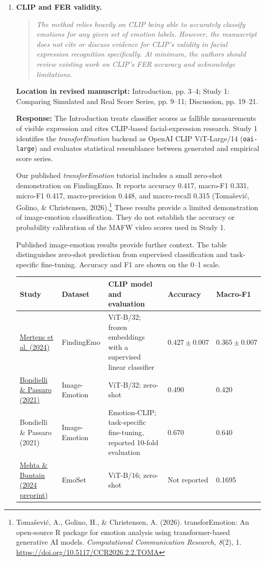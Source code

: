 \documentclass[11pt]{article}
\newenvironment{reviewquote}{\begin{quote}\small\itshape}{\end{quote}}
\newcommand{\point}[1]{\textbf{#1.}}
\newcommand{\location}[1]{\textbf{Location in revised manuscript:} #1\par}
\newcommand{\response}{\textbf{Response:} }
\begin{document}
\begin{enumerate}[resume]
  \item \point{CLIP and FER validity}
  \begin{reviewquote}
  The method relies heavily on CLIP being able to accurately classify emotions for any given set of emotion labels. However, the manuscript does not cite or discuss evidence for CLIP's validity in facial expression recognition specifically. At minimum, the authors should review existing work on CLIP's FER accuracy and acknowledge limitations.
  \end{reviewquote}
  \location{Introduction, pp. 3--4; Study 1: Comparing Simulated and Real Score Series, pp. 9--11; Discussion, pp. 19--21.}
  \response The Introduction treats classifier scores as fallible measurements of visible expression and cites CLIP-based facial-expression research. Study 1 identifies the \textit{transforEmotion} backend as OpenAI CLIP ViT-Large/14 (\texttt{oai-large}) and evaluates statistical resemblance between generated and empirical score series.

  Our published \textit{transforEmotion} tutorial includes a small zero-shot demonstration on FindingEmo. It reports accuracy 0.417, macro-F1 0.331, micro-F1 0.417, macro-precision 0.448, and macro-recall 0.315 (Tomašević, Golino, \& Christensen, 2026).\footnote{Tomašević, A., Golino, H., \& Christensen, A. (2026). transforEmotion: An open-source R package for emotion analysis using transformer-based generative AI models. \textit{Computational Communication Research, 8}(2), 1. \url{https://doi.org/10.5117/CCR2026.2.2.TOMA}} These results provide a limited demonstration of image-emotion classification. They do not establish the accuracy or probability calibration of the MAFW video scores used in Study 1.

  Published image-emotion results provide further context. The table distinguishes zero-shot prediction from supervised classification and task-specific fine-tuning. Accuracy and F1 are shown on the 0--1 scale.

  \begin{center}
  \small
  \setlength{\tabcolsep}{3pt}
  \renewcommand{\arraystretch}{1.15}
  \begin{tabular}{p{1.08in}p{0.86in}p{2.00in}p{0.90in}p{0.90in}}
  \hline
  Study & Dataset & CLIP model and evaluation & Accuracy & Macro-F1 \\
  \hline
  \href{https://arxiv.org/abs/2402.01355}{Mertens et al. (2024)} & FindingEmo & ViT-B/32; frozen embeddings with a supervised linear classifier & \mbox{$0.427\pm 0.007$} & \mbox{$0.365\pm 0.007$} \\
  \href{https://ceur-ws.org/Vol-3015/paper172.pdf}{Bondielli \& Passaro (2021)} & Image-Emotion & ViT-B/32; zero-shot & 0.490 & 0.420 \\
  Bondielli \& Passaro (2021) & Image-Emotion & Emotion-CLIP; task-specific fine-tuning, reported 10-fold evaluation & 0.670 & 0.640 \\
  \href{https://arxiv.org/abs/2411.05985}{Mehta \& Buntain (2024 preprint)} & EmoSet & ViT-B/16; zero-shot & Not reported & 0.1695 \\
  \hline
  \end{tabular}
  \end{center}


\end{enumerate}
\end{document}
